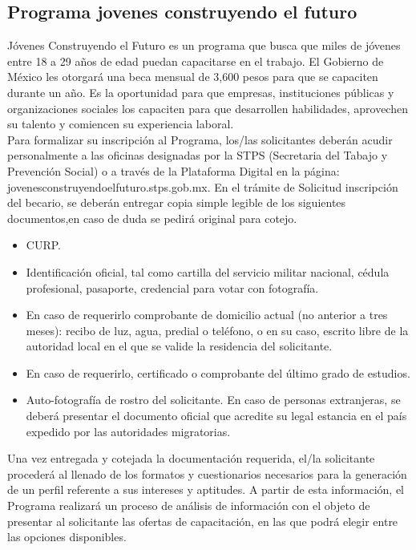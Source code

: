     

\subsection{Programa jovenes construyendo el futuro}

    Jóvenes Construyendo el Futuro es un programa que busca que miles de jóvenes entre 18 a 29 años de edad puedan capacitarse en el trabajo. El Gobierno de México les otorgará una beca mensual de 3,600 pesos para que se capaciten durante un año. Es la oportunidad para que empresas, instituciones públicas y organizaciones sociales los capaciten para que desarrollen habilidades, aprovechen su talento y comiencen su experiencia laboral.\\
    
    Para formalizar su inscripción al Programa, los/las solicitantes deberán acudir personalmente a las oficinas designadas por la STPS (Secretaria del Tabajo y Prevención Social) o a través de la Plataforma Digital en la página: jovenesconstruyendoelfuturo.stps.gob.mx. En el trámite de Solicitud inscripción del becario, se deberán entregar copia simple legible de los siguientes documentos,en caso de duda se pedirá original para cotejo.\\
    
    \begin{itemize}
    \item  CURP. 
    \item  Identificación oficial, tal como cartilla del servicio militar nacional, cédula profesional, pasaporte, credencial para votar con fotografía. 
    \item  En caso de requerirlo comprobante de domicilio actual (no anterior a tres meses): recibo de luz, agua, predial o teléfono, o en su caso, escrito libre de la autoridad local en el que se valide la residencia del solicitante. 
    \item  En caso de requerirlo, certificado o comprobante del último grado de estudios. 
    \item  Auto-fotografía de rostro del solicitante. En caso de personas extranjeras, se deberá presentar el documento oficial que acredite su legal estancia en el país expedido por las autoridades migratorias. 
    \end{itemize} 
    
    Una vez entregada y cotejada la documentación requerida, el/la solicitante procederá al llenado de los formatos y cuestionarios necesarios para la generación de un perfil referente a sus intereses y aptitudes.
    A partir de esta información, el Programa realizará un proceso de análisis de información con el objeto de presentar al solicitante las ofertas de capacitación, en las que podrá elegir entre las opciones disponibles.\\
    
